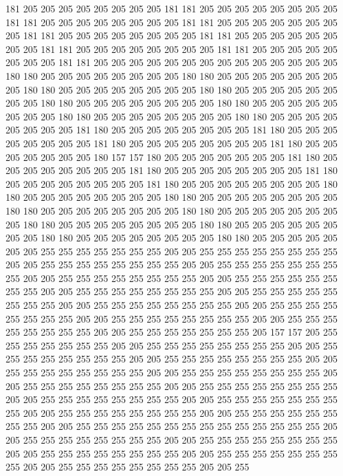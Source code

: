 181 205 205 205 205 205 205 205 205 181 181 205 205 205 205 205 205 205 205 181
181 205 205 205 205 205 205 205 205 181 181 205 205 205 205 205 205 205 205 181
181 205 205 205 205 205 205 205 205 181 181 205 205 205 205 205 205 205 205 181
181 205 205 205 205 205 205 205 205 181 181 205 205 205 205 205 205 205 205 181
181 205 205 205 205 205 205 205 205 205 205 205 205 205 205 180 180 205 205 205
205 205 205 205 205 180 180 205 205 205 205 205 205 205 205 180 180 205 205 205
205 205 205 205 205 180 180 205 205 205 205 205 205 205 205 180 180 205 205 205
205 205 205 205 205 180 180 205 205 205 205 205 205 205 205 180 180 205 205 205
205 205 205 205 205 180 180 205 205 205 205 205 205 205 205 181 180 205 205 205
205 205 205 205 205 181 180 205 205 205 205 205 205 205 205 181 180 205 205 205
205 205 205 205 205 181 180 205 205 205 205 205 205 205 180 157 157 180 205 205
205 205 205 205 205 181 180 205 205 205 205 205 205 205 205 181 180 205 205 205
205 205 205 205 205 181 180 205 205 205 205 205 205 205 205 181 180 205 205 205
205 205 205 205 205 180 180 205 205 205 205 205 205 205 205 180 180 205 205 205
205 205 205 205 205 180 180 205 205 205 205 205 205 205 205 180 180 205 205 205
205 205 205 205 205 180 180 205 205 205 205 205 205 205 205 180 180 205 205 205
205 205 205 205 205 180 180 205 205 205 205 205 205 205 205 180 180 205 205 205
205 205 205 205 255 255 255 255 255 255 255 205 205 255 255 255 255 255 255 255
255 205 205 255 255 255 255 255 255 255 255 205 205 255 255 255 255 255 255 255
255 205 205 255 255 255 255 255 255 255 255 205 205 255 255 255 255 255 255 255
255 205 205 255 255 255 255 255 255 255 255 205 205 255 255 255 255 255 255 255
255 205 205 255 255 255 255 255 255 255 255 205 205 255 255 255 255 255 255 255
255 205 205 255 255 255 255 255 255 255 255 205 205 255 255 255 255 255 255 255
255 205 205 255 255 255 255 255 255 255 205 157 157 205 255 255 255 255 255 255
255 205 205 255 255 255 255 255 255 255 255 205 205 255 255 255 255 255 255 255
255 205 205 255 255 255 255 255 255 255 255 205 205 255 255 255 255 255 255 255
255 205 205 255 255 255 255 255 255 255 255 205 205 255 255 255 255 255 255 255
255 205 205 255 255 255 255 255 255 255 255 205 205 255 255 255 255 255 255 255
255 205 205 255 255 255 255 255 255 255 255 205 205 255 255 255 255 255 255 255
255 205 205 255 255 255 255 255 255 255 255 205 205 255 255 255 255 255 255 255
255 255 255 255 255 255 255 205 205 255 255 255 255 255 255 255 255 205 205 255
255 255 255 255 255 255 255 205 205 255 255 255 255 255 255 255 255 205 205 255
255 255 255 255 255 255 255 205 205 255 255 255 255 255 255 255 255 205 205 255
